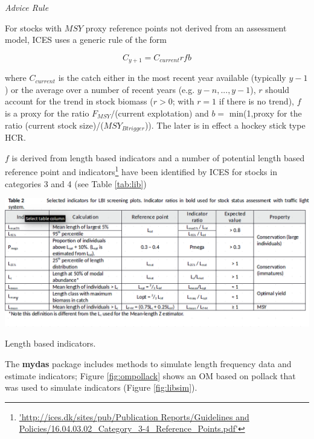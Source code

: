 \textit{Advice Rule}

For stocks with $MSY$ proxy reference points not derived from an assessment model, ICES uses a generic rule of the form 
 
\begin{equation}C_{y+1}=C_{current}rfb\end{equation}

where $C_{current}$ is the catch either in the most recent year available (typically $y-1$) or the average over a number of recent years (e.g. $y-n, ... ,y-1$), $r$ should account for the trend in stock biomass ($r>0$; with $r=1$ if there is no trend), $f$  is a proxy for the ratio $F_{MSY}/$(current explotation) and $b=$ min(1,proxy for the ratio (current stock size)/($MSY_{Btrigger}$)). The later is in effect a hockey stick type HCR. 

$f$ is derived from length based indicators and a number of potential length based reference point and indicators\footnote{\url{'http://ices.dk/sites/pub/Publication Reports/Guidelines and Policies/16.04.03.02_Category_3-4_Reference_Points.pdf'}} have been identified by ICES for stocks in categories 3 and 4 (see Table \ref{tab:lib}) 

\begin{table}[h!]\centering
\includegraphics[width=\textwidth]{figs/lib.png}
\caption{Length based indicators.}
\label{tab:lib}
\end{table}

The \textbf{mydas} package includes methods to simulate length frequency data and estimate indicators; Figure \ref{fig:ompollack} shows an OM based on pollack that was used to simulate indicators (Figure \ref{fig:libsim}).

